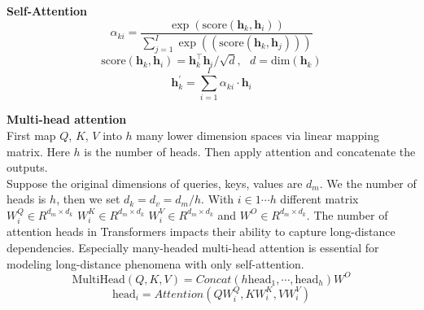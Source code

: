 %
%
\textbf{Self-Attention}\\
\[ \alpha_{ki} = \frac{\exp(\text{score}(\bm{h}_k, \bm{h}_i))}{\sum_{j=1}^{I} \exp((\text{score}(\bm{h}_k, \bm{h}_j)))}\]
\[ \text{score}(\bm{h}_k, \bm{h}_i) = \bm{h}_k^\top \bm{h}_i /\sqrt{d} , \ \ \ d= \text{dim}(\bm{h}_k)\]
\[\bm{h}_k^{\prime} = \sum_{i=1}^{I} \alpha_{ki} \cdot \bm{h}_i\]

\textbf{Multi-head attention}\\
 First map $Q$, $K$, $V$ into $h$ many lower dimension spaces via linear mapping matrix. Here $h$ is the number of heads. Then apply attention and concatenate the outputs. \\
Suppose the original dimensions of queries, keys, values are ${d_{m}}$. We the number of heads is ${h}$, then we set ${d_k = d_v = d_{m}/h}$. With ${i \in 1 \cdots h}$ different matrix ${W_i^Q \in R^{d_{m}\times d_k}}$ ${W_i^K \in R^{d_{m}\times d_k}}$ ${W_i^V \in R^{d_{m}\times d_k}}$ and ${W^O \in R^{d_{m}\times d_k}}$.
The number of attention heads in Transformers impacts their ability to capture long-distance dependencies. Especially many-headed multi-head attention is essential for modeling long-distance phenomena with only self-attention.
\[ \text{MultiHead}(Q, K, V) = Concat(h\text{head}_1, \cdots, \text{head}_h)W^O \]
\[\text{head}_i = Attention(QW_i^Q, KW_i^K, VW_i^V) \]

